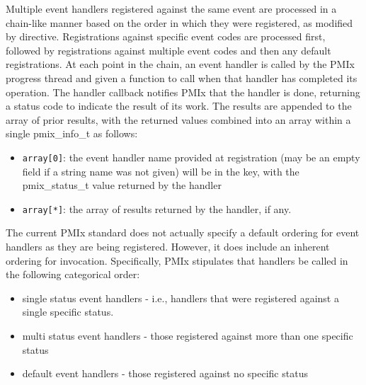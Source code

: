 Multiple event handlers registered against the same event are processed in a chain-like manner based on the order in which they were registered, as modified by directive. Registrations against specific event codes are processed first, followed by registrations against multiple event codes and then any default registrations. At each point in the chain, an event handler is called by the PMIx progress thread and given a function to call when that handler has completed its operation. The handler callback notifies PMIx that the handler is done, returning a status code to indicate the result of its work. The results are appended to the array of prior results, with the returned values combined into an array within a single pmix_info_t as follows:
\begin{itemize}
\item \texttt{array[0]}: the event handler name provided at registration (may be an empty field if a string name was not given) will be in the key, with the pmix_status_t value returned by the handler
\item \texttt{array[*]}: the array of results returned by the handler, if any.
\end{itemize}

The current PMIx standard does not actually specify a default ordering for event handlers as they are being registered. However, it does include an inherent ordering for invocation. Specifically, PMIx stipulates that handlers be called in the following categorical order:

\begin{itemize}
\item single status event handlers - i.e., handlers that were registered against a single specific status.
\item multi status event handlers - those registered against more than one specific status
\item default event handlers - those registered against no specific status
\end{itemize}

\relatedapis

{\large {}}


